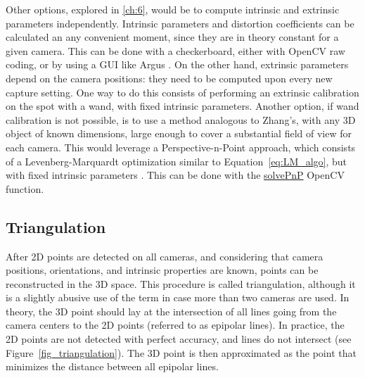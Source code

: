 Other options, explored in \autoref{ch:6}, would be to compute intrinsic and extrinsic parameters independently. Intrinsic parameters and distortion coefficients can be calculated an any convenient moment, since they are in theory constant for a given camera. This can be done with a checkerboard, either with OpenCV raw coding, or by using a GUI like Argus \cite{Argus}. On the other hand, extrinsic parameters depend on the camera positions: they need to be computed upon every new capture setting. One way to do this consists of performing an extrinsic calibration on the spot with a wand, with fixed intrinsic parameters. Another option, if wand calibration is not possible, is to use a method analogous to Zhang's, with any 3D object of known dimensions, large enough to cover a substantial field of view for each camera. This would leverage a Perspective-n-Point approach, which consists of a Levenberg-Marquardt optimization similar to Equation~\ref{eq:LM_algo}, but with fixed intrinsic parameters \cite{Marchand2015}. This can be done with the \href{https://docs.opencv.org/4.x/d9/d0c/group__calib3d.html#ga549c2075fac14829ff4a58bc931c033d}{solvePnP} OpenCV function. 



\newpage
\subsection{Triangulation}\label{triangulation}
 
After 2D points are detected on all cameras, and considering that camera positions, orientations, and intrinsic properties are known, points can be reconstructed in the 3D space. This procedure is called triangulation, although it is a slightly abusive use of the term in case more than two cameras are used. In theory, the 3D point should lay at the intersection of all lines going from the camera centers to the 2D points (referred to as epipolar lines). In practice, the 2D points are not detected with perfect accuracy, and lines do not intersect (see Figure~\ref{fig_triangulation}). The 3D point is then approximated as the point that minimizes the distance between all epipolar lines.

